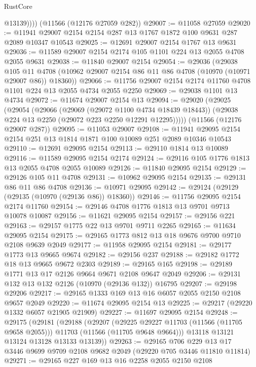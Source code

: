 \begin{lexlean}{RustCore}
\begin{coremodule}
            @13139))))
    (@11566 (@12176 @27059 @282))
@29007 := @11058 @27059
@29020 := @11941 @29007 @2154 @2154 @287 @13 @1767 @1872 @100 @9631 @287 @2089 @10347 @10543
@29025 := @12691 @29007 @2154 @1767 @13 @9631
@29036 := @11589 @29007 @2154 @2174 @105 @1101 @224 @13 @2055 @4708 @2055 @9631
@29038 := @11840 @29007 @2154
@29054 := @29036
    (@29038
      @105
      @11
      @4708
      (@10962 @29007 @2154 @86 @11 @86 @4708 (@10970 (@10971 @29007 @86)) @18360))
@29066 := @11756 @29007 @2154 @2174 @11760 @4708 @1101 @224 @13 @2055 @4734 @2055 @2250
@29069 := @29038 @1101 @13 @4734
@29072 := @11674 @29007 @2154 @13
@29094 := @29020
    (@29025
      (@29054
        (@29066
          (@29069 (@29072 @1100 @4734 @18439 @18443))
          (@29038 @224 @13 @2250 (@29072 @223 @2250 @12291 @12295)))))
    (@11566 (@12176 @29007 @287))
@29095 := @11053 @29007
@29108 := @11941 @29095 @2154 @2154 @251 @13 @1814 @1871 @100 @10089 @251 @2089 @10346 @10543
@29110 := @12691 @29095 @2154
@29113 := @29110 @1814 @13 @10089
@29116 := @11589 @29095 @2154 @2174
@29124 := @29116 @105 @1776 @1813 @13 @2055 @4708 @2055 @10089
@29126 := @11840 @29095 @2154
@29129 := @29126 @105 @11 @4708
@29131 := @10962 @29095 @2154
@29135 := @29131 @86 @11 @86 @4708
@29136 := @10971 @29095
@29142 := @29124 (@29129 (@29135 (@10970 (@29136 @86)) @18360))
@29146 := @11756 @29095 @2154 @2174 @11760
@29154 := @29146 @4708 @1776 @1813 @13 @9701 @9713 @10078 @10087
@29156 := @11621 @29095 @2154
@29157 := @29156 @221
@29163 := @29157 @1775 @22 @13 @9701 @9711 @2265
@29165 := @11634 @29095 @2154
@29175 := @29165 @1773 @812 @13 @18 @9676 @9700 @9710 @2108 @9639 @2049
@29177 := @11958 @29095 @2154
@29181 := @29177 @1773 @13 @9665 @9674
@29182 := @29156 @237
@29188 := @29182 @1772 @18 @13 @9665 @9672 @2303
@29189 := @29165 @165
@29198 := @29189 @1771 @13 @17 @2126 @9664 @9671 @2108 @9647 @2049
@29206 := @29131 @132 @13 @132 @2126 (@10970 (@29136 @132)) @16795
@29207 := @29198 @29206
@29217 := @29165 @1333 @169 @13 @16 @6057 @2055 @2150 @2108 @9657 @2049
@29220 := @11674 @29095 @2154 @13
@29225 := @29217 (@29220 @1332 @6057 @21905 @21909)
@29227 := @11697 @29095 @2154
@29248 := @29175
    (@29181
      (@29188
        (@29207
          (@29225 @29227 @11703 (@11566 (@11705 @9658 @2055)))
          @11703
          (@11566 (@11705 @9648 @9664)))
        @13118
        @13121
        @13124
        @13128
        @13133
        @13139))
@29263 := @29165
    @706
    @229
    @13
    @17
    @3446
    @9699
    @9709
    @2108
    @9682
    @2049
    (@29220 @705 @3446 @11810 @11814)
@29271 := @29165 @227 @169 @13 @16 @2258 @2055 @2150 @2108

\end{coremodule}
\end{lexlean}
